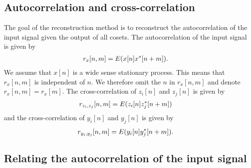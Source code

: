\documentclass[a4paper, openany, oneside]{memoir}
\begin{document}
\subsection{Autocorrelation and cross-correlation}
The goal of the reconstruction method is to reconstruct the autocorrelation of the input signal given the output of all cosets. The autocorrelation of the input signal is given by
\begin{align*}
    r_x[n,m] = E(x[n]x^*[n+m]).
\end{align*}
We assume that $x[n]$ is a wide sense stationary process. This means that $r_x[n,m]$ is independent of $n$. We therefore omit the $n$ in $r_x[n,m]$ and denote $r_x[n,m]=r_x[m]$. The cross-correlation of $z_i[n]$ and $z_j[n]$ is given by
\begin{align*}
    r_{z_i,z_j}[n,m]=E(z_i[n]z^*_j[n+m])
\end{align*} and the cross-correlation of $y_i[n]$ and $y_j[n]$ is given by
\begin{align*}
    r_{y_i,y_j}[n,m]=E(y_i[n]y^*_j[n+m]).
\end{align*}

\subsection{Relating the autocorrelation of the input signal}
\end{document}
